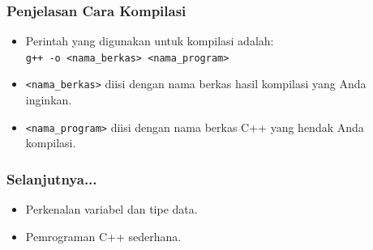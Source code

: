 \begin{frame}
\frametitle{Penjelasan Cara Kompilasi}
\begin{itemize}
  \item Perintah yang digunakan untuk kompilasi adalah:\\
  \texttt{g++ -o <nama\_berkas> <nama\_program>}
  \item \texttt{<nama\_berkas>} diisi dengan nama berkas hasil kompilasi yang Anda inginkan.
  \item \texttt{<nama\_program>} diisi dengan nama berkas C++ yang hendak Anda kompilasi.
\end{itemize}
\end{frame}

\begin{frame}
\frametitle{Selanjutnya...}
\begin{itemize}
  \item Perkenalan variabel dan tipe data.
  \item Pemrograman C++ sederhana.
\end{itemize}
\end{frame}


